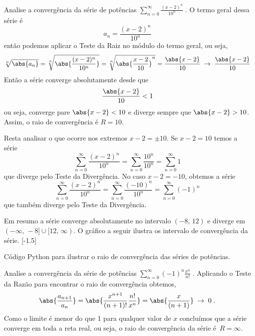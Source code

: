 \begin{example}
  Analise a convergência da série de potências
  \(
  	\sum_{n=0}^\infty \frac{(x-2)^n}{10^n}   \;.
 	\)
  \solution
  O termo geral dessa série é
  \[
  	a_n=\frac{(x-2)^n}{10^n}
 	\]
  então podemos aplicar o Teste da Raiz no módulo do termo geral, ou seja,
  \[
  	\sqrt[n]{\abs{a_n}}                     =
    \sqrt[n]{\abs{\frac{(x-2)^n}{10^n}}}    =
    \sqrt[n]{\abs{\frac{x-2}{10}}^n}        =
    \frac{\abs{x-2}}{10}                    \;\rightarrow\;
    \frac{\abs{x-2}}{10}
 	\]
  Então a série converge absolutamente desde que
  \[
  	\frac{\abs{x-2}}{10} < 1
 	\]
  ou seja, converge pare
  \(
  	\abs{x-2} < 10
 	\)
  e diverge sempre que
  \(
    \abs{x-2}>10
  \).
  Assim, o raio de convergência é $R=10$.

  Resta analisar o que ocorre nos extremos $x-2=\pm 10$.
  Se $x-2=10$ temos a série
  \[
    \sum_{n=0}^\infty \frac{(x-2)^n}{10^n} =
    \sum_{n=0}^\infty \frac{10^n}{10^n} =
    \sum_{n=0}^\infty 1
  \]
  que diverge pelo Teste da Divergência.
  No caso $x-2=-10$, obtemos a série
  \[
    \sum_{n=0}^\infty \frac{(x-2)^n}{10^n} =
    \sum_{n=0}^\infty \frac{(-10)^n}{10^n} =
    \sum_{n=0}^\infty (-1)^n
  \]
  que também diverge pelo Teste da Divergência.

  Em resumo a série converge absolutamente no intervalo $(-8,\,12)$
  e diverge em $(-\infty,\,-8]\cup[12,\,\infty)$.
  O gráfico a seguir ilustra os intervalo de convergência da série.
  [-1.5]
\end{example}

{
  Código Python para ilustrar o raio de convergência das séries de potências.
}

\begin{example}
  Analise a convergência da série de potências
  \(
  	\sum_{n=0}^\infty (-1)^n\frac{x^n}{n!}  \;.
 	\)
  \solution
  Aplicando o Teste da Razão para encontrar o raio de convergência obtemos,
  \[
      \abs{\frac{a_{n+1}}{a_n}} =
      \abs{\frac{x^{n+1}}{(n+1)!}\frac{n!}{x^n}} =
      \abs{\frac{x}{(n+1)}}
      \;\rightarrow\; 0  \;.
  \]
  Como o limite é menor do que 1 para qualquer valor de $x$
  concluímos que a série converge em toda a reta real,
  ou seja, o raio de convergência da série é~$R=\infty$.
\end{example}

